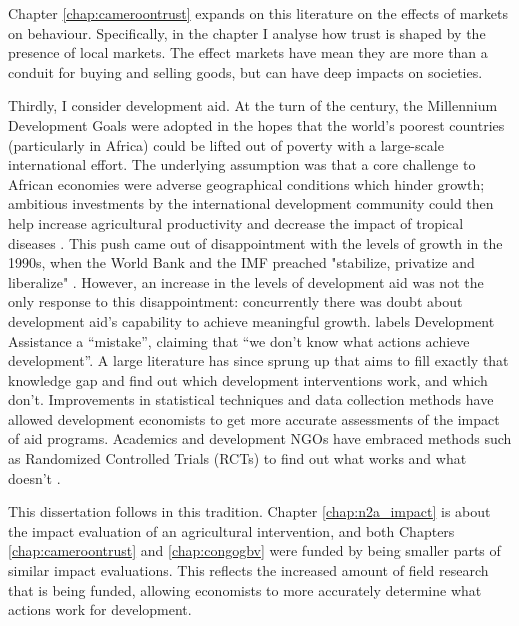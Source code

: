 Chapter \ref{chap:cameroontrust} expands on this literature on the effects of markets on behaviour. Specifically, in the chapter I analyse how trust is shaped by the presence of local markets. The effect markets have mean they are more than a conduit for buying and selling goods, but can have deep impacts on societies.

Thirdly, I consider development aid. At the turn of the century, the Millennium Development Goals were adopted in the hopes that the world's poorest countries (particularly in Africa) could be lifted out of poverty with a large-scale international effort. The underlying assumption was that a core challenge to African economies were adverse geographical conditions which hinder growth; ambitious investments by the international development community could then help increase agricultural productivity and decrease the impact of tropical diseases \citep{Sachs2005}. This push came out of disappointment with the levels of growth in the 1990s, when the World Bank and the IMF preached "stabilize, privatize and liberalize" \citep{Rodrik2006a}. However, an increase in the levels of development aid was not the only response to this disappointment: concurrently there was doubt about development aid's capability to achieve meaningful growth. \citet{Easterly2007} labels Development Assistance a ``mistake'', claiming that ``we don't know what actions achieve development''. A large literature has since sprung up that aims to fill exactly that knowledge gap and find out which development interventions work, and which don't. Improvements in statistical techniques and data collection methods have allowed development economists to get more accurate assessments of the impact of aid programs. Academics and development NGOs have embraced methods such as Randomized Controlled Trials (RCTs) to find out what works and what doesn't \citep[see e.g.][]{Bannerjee2011}.  

This dissertation follows in this tradition. Chapter \ref{chap:n2a_impact} is about the impact evaluation of an agricultural intervention, and both Chapters \ref{chap:cameroontrust} and \ref{chap:congogbv} were funded by being smaller parts of similar impact evaluations. This reflects the increased amount of field research that is being funded, allowing economists to more accurately determine what actions work for development.

